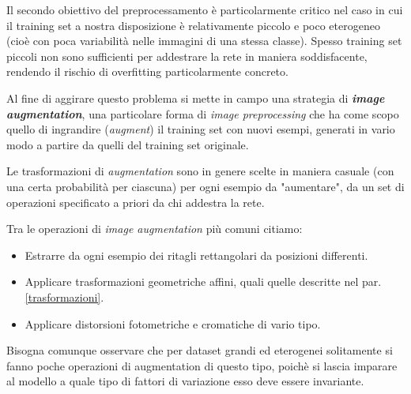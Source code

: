 Il secondo obiettivo del preprocessamento è particolarmente critico nel caso in cui il training set a nostra disposizione è relativamente piccolo e poco eterogeneo (cioè con poca variabilità nelle immagini di una stessa classe). Spesso training set piccoli non sono sufficienti per addestrare la rete in maniera soddisfacente, rendendo il rischio di overfitting particolarmente concreto.

Al fine di aggirare questo problema si mette in campo una strategia di \textbf{\textit{image augmentation}}, una particolare forma di \textit{image preprocessing} che ha come scopo quello di ingrandire (\textit{augment}) il training set con nuovi esempi, generati in vario modo a partire da quelli del training set originale.

Le trasformazioni di \textit{augmentation} sono in genere scelte in maniera casuale (con una certa probabilità per ciascuna) per ogni esempio da "aumentare", da un set di operazioni specificato a priori da chi addestra la rete.

Tra le operazioni di \textit{image augmentation} più comuni citiamo:

\begin{itemize}
\item Estrarre da ogni esempio dei ritagli rettangolari da posizioni differenti.
\item Applicare trasformazioni geometriche affini, quali quelle descritte nel par. \ref{trasformazioni}.
\item Applicare distorsioni fotometriche e cromatiche di vario tipo.
\end{itemize}

Bisogna comunque osservare che per dataset grandi ed eterogenei solitamente si fanno poche operazioni di augmentation di questo tipo, poichè si lascia imparare al modello a quale tipo di fattori di variazione esso deve essere invariante.\\

